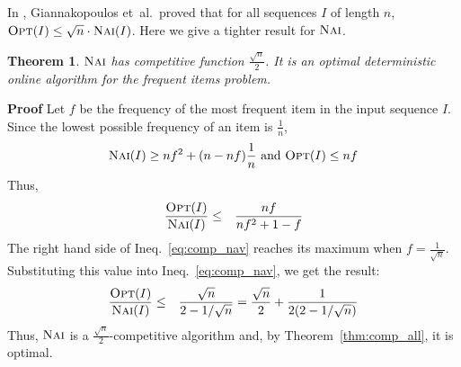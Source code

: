 \documentclass[11pt]{article}
\newtheorem{xtheorem}{Theorem}
\newenvironment{theorem}{\begin{xtheorem}\rm}{\end{xtheorem}}
\newenvironment{proof}{\begin{trivlist}\item[]{\bf Proof }}{\hspace*{\fill}\raisebox{-1pt}{\boldmath$\Box$}\end{trivlist}}
\newcommand{\opt}{{\ensuremath{\textsc{Opt}}}\xspace}
\newcommand{\nav}{{\ensuremath{\textsc{Nai}}}\xspace}
\begin{document}
In \cite{Giannakopoulos12}, Giannakopoulos et~al.\ proved that
for all sequences $I$ of length $n$, $\opt(I)\leq \sqrt{n}\cdot\nav(I)$.
Here we give a tighter result for \nav.
\begin{theorem}\label{thm:comp_nav}
\nav has competitive function $\frac{\sqrt{n}}{2}$. It is an 
optimal deterministic online algorithm for the frequent items problem.
\end{theorem}
\begin{proof}
Let $f$ be the frequency of the most frequent item in the input sequence $I$.
Since the lowest possible frequency of an item is $\frac{1}{n}$,
\[
\nav(I) \geq nf^2 + (n-nf)\frac{1}{n}
\mbox{ and }
\opt(I) \leq nf
\]
Thus,
\begin{eqnarray}
\frac{\opt(I)}{\nav(I)} &\leq& \frac{nf}{nf^2 + 1 -f}  \label{eq:comp_nav}
\end{eqnarray}
The right hand side of Ineq.~\ref{eq:comp_nav} reaches its maximum when $f=\frac{1}{\sqrt{n}}$.
Substituting this value into Ineq.~\ref{eq:comp_nav}, we get the result:
\begin{eqnarray}
\frac{\opt(I)}{\nav(I)} &\leq& \frac{\sqrt{n}}{2-1/\sqrt{n}}  = \frac{\sqrt{n}}{2} + \frac{1}{2(2-1/\sqrt{n})} \nonumber
\end{eqnarray}
Thus, \nav is a $\frac{\sqrt{n}}{2}$-competitive algorithm and,
by Theorem~\ref{thm:comp_all}, it is optimal.

\end{proof}
\end{document}
